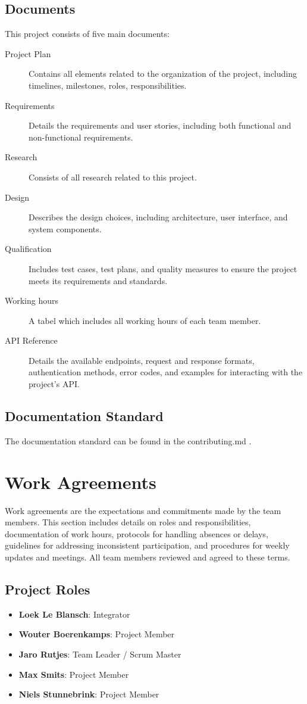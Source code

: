 \documentclass{projdoc}
\begin{document}
\subsection{Documents}

This project consists of five main documents:\noparbreak

\begin{description}
	\item[Project Plan] Contains all elements related to the organization of the
	 project, including timelines, milestones, roles, responsibilities.
	\item[Requirements] Details the requirements and 
	user stories, including both functional and non-functional requirements. 
	\item[Research] Consists of all research related to this project.
	\item[Design] Describes the design choices, including architecture,
	 user interface, and system components.
	\item[Qualification] Includes test cases, test plans, and quality 
	measures to ensure the project meets its requirements and standards.
	\item[Working hours] A tabel which includes all working hours of each team member.
	\item[API Reference] Details the available endpoints, request and response formats, authentication methods, error codes, and examples for interacting with the project's API.
\end{description}

\subsection{Documentation Standard}
The documentation standard can be found in the contributing.md \autocite{crepe:docs-standard}.


\section{Work Agreements}
Work agreements are the expectations and commitments made by the team members. 
This section includes details on roles and responsibilities, documentation of 
work hours, protocols for handling absences or delays, guidelines for addressing
 inconsistent participation, and procedures for weekly updates and meetings. All
  team members reviewed and agreed to these terms.

\subsection{Project Roles}
\begin{itemize}
	\item \textbf{Loek Le Blansch}: Integrator
	\item \textbf{Wouter Boerenkamps}: Project Member
	\item \textbf{Jaro Rutjes}: Team Leader / Scrum Master
	\item \textbf{Max Smits}: Project Member
	\item \textbf{Niels Stunnebrink}: Project Member
\end{itemize}
\end{document}

